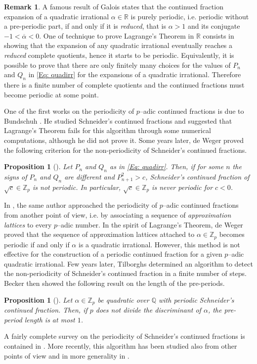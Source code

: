 \documentclass[12pt, reqno]{amsart}
\theoremstyle{plain}
\newtheorem{Proposition}[Theorem]{Proposition}
\theoremstyle{definition}
\newtheorem{Remark}[Theorem]{Remark}
\begin{document}
\begin{Remark}\label{Rem: Lag}
A famous result of Galois \cite{GAL} states that the continued fraction expansion of a quadratic irrational $\alpha\in\mathbb{R}$ is purely periodic, i.e. periodic without a pre-periodic part, if and only if it is \textit{reduced}, that is $\alpha>1$ and its conjugate $-1<\overline{\alpha}<0$. One of technique to prove Lagrange's Theorem \cite{LAG} in $\mathbb{R}$ consists in showing that the expansion of any quadratic irrational eventually reaches a \textit{reduced} complete quotients, hence it starts to be periodic. Equivalently, it is possible to prove that there are only finitely many choices for the values of $P_n$ and $Q_n$ in \eqref{Eq: quadirr} for the expansions of a quadratic irrational. Therefore there is a finite number of complete quotients and the continued fractions must become periodic at some point.
\end{Remark}

One of the first works on the periodicity of $p$--adic continued fractions is due to Bundschuh \cite{BUN}. He studied Schneider's continued fractions and suggested that Lagrange's Theorem fails for this algorithm through some numerical computations, although he did not prove it. Some years later, de Weger \cite{DEWII} proved the following criterion for the non-periodicity of Schneider's continued fractions.
\begin{Proposition}[\cite{DEWII}]\label{Pro: Dewe}
Let $P_n$ and $Q_n$ as in \eqref{Eq: quadirr}. Then, if for some $n$ the signs of $P_n$ and $Q_n$ are different and $P_{n+1}^2>c$, Schneider's continued fraction of $\sqrt{c}\in\mathbb{Z}_p$ is not periodic. In particular, $\sqrt{c}\in\mathbb{Z}_p$ is never periodic for $c<0$.
\end{Proposition}
In \cite{DEWI}, the same author approached the periodicity of $p$--adic continued fractions from another point of view, i.e. by associating a sequence of \textit{approximation lattices} to every $p$--adic number. In the spirit of Lagrange's Theorem, de Weger proved that the sequence of approximation lattices attached to $\alpha\in\mathbb{Z}_p$ becomes periodic if and only if $\alpha$ is a quadratic irrational. However, this method is not effective for the construction of a periodic continued fraction for a given $p$--adic quadratic irrational. Few years later, Tilborghs \cite{TIL} determined an algorithm to detect the non-periodicity of Schneider's continued fraction in a finite number of steps. Becker \cite{BECK} then showed the following result on the length of the pre-periods.
\begin{Proposition}[\cite{BECK}]
Let $\alpha\in\mathbb{Z}_p$ be quadratic over $\mathbb{Q}$ with periodic Schneider's continued fraction. Then, if $p$ does not divide the discriminant of $\alpha$, the pre-period length is at most $1$.
\end{Proposition}
A fairly complete survey on the periodicity of Schneider's continued fractions is contained in \cite{VDP}. More recently, this algorithm has been studied also from other points of view and in more generality in \cite{NH, HJLN, HYZ}.\\
\end{document}
